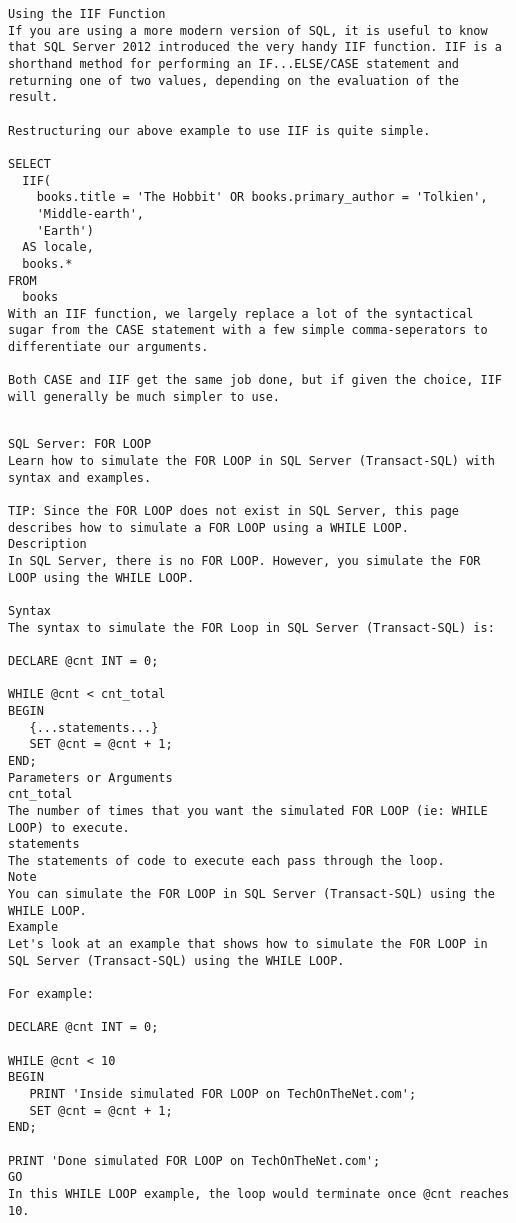 \begin{lstlisting}[frame=single]
Using the IIF Function
If you are using a more modern version of SQL, it is useful to know that SQL Server 2012 introduced the very handy IIF function. IIF is a shorthand method for performing an IF...ELSE/CASE statement and returning one of two values, depending on the evaluation of the result.

Restructuring our above example to use IIF is quite simple.

SELECT
  IIF(
    books.title = 'The Hobbit' OR books.primary_author = 'Tolkien',
    'Middle-earth',
    'Earth')
  AS locale,
  books.*
FROM
  books
With an IIF function, we largely replace a lot of the syntactical sugar from the CASE statement with a few simple comma-seperators to differentiate our arguments.

Both CASE and IIF get the same job done, but if given the choice, IIF will generally be much simpler to use.

\end{lstlisting}

\newpage

\begin{lstlisting}[frame=single]

SQL Server: FOR LOOP
Learn how to simulate the FOR LOOP in SQL Server (Transact-SQL) with syntax and examples.

TIP: Since the FOR LOOP does not exist in SQL Server, this page describes how to simulate a FOR LOOP using a WHILE LOOP.
Description
In SQL Server, there is no FOR LOOP. However, you simulate the FOR LOOP using the WHILE LOOP.

Syntax
The syntax to simulate the FOR Loop in SQL Server (Transact-SQL) is:

DECLARE @cnt INT = 0;

WHILE @cnt < cnt_total
BEGIN
   {...statements...}
   SET @cnt = @cnt + 1;
END;
Parameters or Arguments
cnt_total
The number of times that you want the simulated FOR LOOP (ie: WHILE LOOP) to execute.
statements
The statements of code to execute each pass through the loop.
Note
You can simulate the FOR LOOP in SQL Server (Transact-SQL) using the WHILE LOOP.
Example
Let's look at an example that shows how to simulate the FOR LOOP in SQL Server (Transact-SQL) using the WHILE LOOP.

For example:

DECLARE @cnt INT = 0;

WHILE @cnt < 10
BEGIN
   PRINT 'Inside simulated FOR LOOP on TechOnTheNet.com';
   SET @cnt = @cnt + 1;
END;

PRINT 'Done simulated FOR LOOP on TechOnTheNet.com';
GO
In this WHILE LOOP example, the loop would terminate once @cnt reaches 10.


\end{lstlisting}    